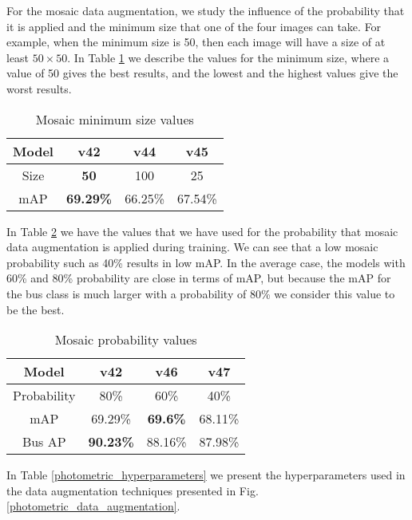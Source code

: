     For the mosaic data augmentation, we study the influence of the probability that it is applied and the minimum size that one of the four images can take. For example, when the minimum size is 50, then each image will have a size of at least $50 \times 50$. In Table \ref{min_size_values_table} we describe the values for the minimum size, where a value of 50 gives the best results, and the lowest and the highest values give the worst results.

    
    \begin{table}[H]
    \caption{Mosaic minimum size values}
    \centering
\begin{tabular}{c|ccc}
Model & \textbf{v42}     & v44     & v45     \\ \hline
Size  & \textbf{50}      & 100     & 25      \\ \hline
mAP   & \textbf{69.29\%} & 66.25\% & 67.54\%
\end{tabular}
    \label{min_size_values_table}
    \end{table}
    
    In Table \ref{mosaic_prob_values_table} we have the values that we have used for the probability that mosaic data augmentation is applied during training. We can see that a low mosaic probability such as 40\% results in low mAP. In the average case, the models with 60\% and 80\% probability are close in terms of mAP, but because the mAP for the bus class is much larger with a probability of 80\% we consider this value to be the best.
    
    \begin{table}[H]
    \centering
        \caption{Mosaic probability values}
\begin{tabular}{c|ccc}
Model       & \textbf{v42}              & v46             & v47     \\ \hline
Probability & 80\%             & 60\%            & 40\%    \\ \hline
mAP         & 69.29\%          & \textbf{69.6\%} & 68.11\% \\ \hline
Bus AP      & \textbf{90.23\%} & 88.16\%         & 87.98\%
\end{tabular}

    \label{mosaic_prob_values_table}
    \end{table}

    In Table \ref{photometric_hyperparameters} we present the hyperparameters used in the data augmentation techniques presented in Fig. \ref{photometric_data_augmentation}.

